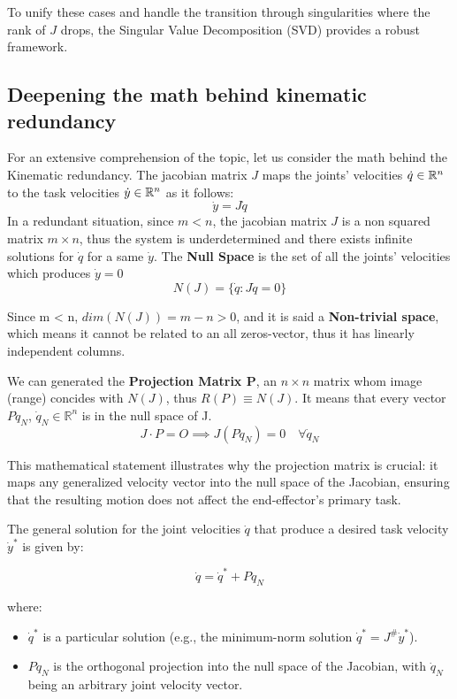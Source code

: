 To unify these cases and handle the transition through singularities where the rank of $J$ drops, 
the Singular Value Decomposition (SVD) provides a robust framework.

\subsection{Deepening the math behind kinematic redundancy}

For an extensive comprehension of the topic, let us consider the math behind the Kinematic redundancy.
The jacobian matrix $J$ maps the joints' velocities $\dot{q} \in \mathbb{R}^n$ to the task velocities $\dot{y}\in \mathbb{R}^n$ as it follows:
$$
\dot{y}=J\dot{q}
$$
In a redundant situation, since $ m < n $, the jacobian matrix $J$ is a non squared matrix $m \times n$, thus the system is underdetermined and there exists infinite solutions
for $\dot{q}$ for a same $\dot{y}$. The \textbf{Null Space} is the set of all the joints' velocities which produces $\dot{y} = 0$
$$
N(J) = \{\dot{q} : J\dot{q}=0\}
$$

Since m < n, $dim(N(J)) = m-n>0$, and it is said a \textbf{Non-trivial space}, which means it cannot be related to an all zeros-vector, thus it has linearly independent columns.

We can generated the \textbf{Projection Matrix P}, an $n \times n$ matrix whom image (range) concides with $N(J)$, thus ${R}(P) \equiv N(J)$. 
It means that every vector $P\dot{q}_N$, $\dot{q}_N \in \mathbb{R}^n$ is in the null space of J.
$$
J \cdot P = O \implies J(P\dot{q}_N) = 0 \quad \forall \dot{q}_N$$

This mathematical statement illustrates why the projection matrix is crucial:
it maps any generalized velocity vector into the null space of the Jacobian, ensuring that the resulting 
motion does not affect the end-effector's primary task.

The general solution for the joint velocities $\dot{q}$ that produce a desired task velocity $\dot{y}^*$ is given by:

\begin{equation}
    \dot{q} = \dot{q}^* + P \dot{q}_N
\end{equation}

where:
\begin{itemize}
    \item $\dot{q}^*$ is a particular solution (e.g., the minimum-norm solution $\dot{q}^* = J^{\#} \dot{y}^*$).
    \item $P \dot{q}_N$ is the orthogonal projection into the null space of the Jacobian, with $\dot{q}_N$ being an arbitrary joint velocity vector.
\end{itemize}

